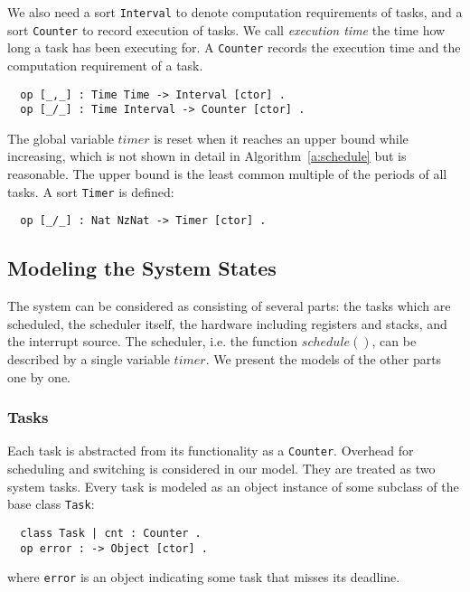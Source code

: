 \documentclass{llncs}
\newcommand{\hide}[1]{\ignorespaces}
\begin{document}
We also need a sort \verb|Interval| to denote computation requirements
of tasks, and a sort \verb|Counter| to record execution of tasks.  We
call \emph{execution time} the time how long a task has been executing
for. A \verb|Counter| records the execution time and the computation
requirement of a task.
\begin{verbatim}
  op [_,_] : Time Time -> Interval [ctor] .  
  op [_/_] : Time Interval -> Counter [ctor] .
\end{verbatim}

\hide{
At last, to make our model checkable by untimed model checking, it is
reasonable to reset the global variable $timer$ when it reaches an
upperbound while increasing (see Line~\ref{l:timer} in
Algorithm~\ref{a:schedule}) in the model. Then $timer$ is of sort
\verb|Timer| and the upperbound would be the least common multiple of
the periods of all tasks.}

The global variable $timer$ is reset when it reaches an upper bound
while increasing, which is not shown in detail in
Algorithm~\ref{a:schedule} but is reasonable. The upper bound is the
least common multiple of the periods of all tasks. A sort \verb|Timer|
is defined:
\begin{verbatim}
  op [_/_] : Nat NzNat -> Timer [ctor] .
\end{verbatim}

\subsection{Modeling the System States}
The system can be considered as consisting of several parts: the tasks
which are scheduled, the scheduler itself, the hardware including
registers and stacks, and the interrupt source. The scheduler,
i.e. the function $schedule()$, can be described by a single variable
$timer$. We present the models of the other parts one by one.

\subsubsection{Tasks}
Each task is abstracted from its functionality as a \verb|Counter|.
Overhead for scheduling and switching is considered in our model. They
are treated as two system tasks. Every task is modeled as an object
instance of some subclass of the base class \verb|Task|:
\begin{verbatim}
  class Task | cnt : Counter .
  op error : -> Object [ctor] .
\end{verbatim}
where \verb|error| is an object indicating some task that misses its
deadline.
\end{document}
